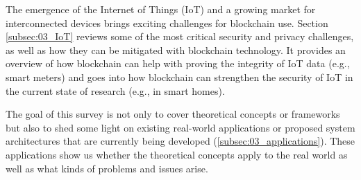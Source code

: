 The emergence of the Internet of Things (IoT) and a growing market for interconnected devices brings exciting challenges for blockchain use. Section \ref{subsec:03_IoT} reviews some of the most critical security and privacy challenges, as well as how they can be mitigated with blockchain technology. It provides an overview of how blockchain can help with proving the integrity of IoT data (e.g., smart meters) and goes into how blockchain can strengthen the security of IoT in the current state of research (e.g., in smart homes).

The goal of this survey is not only to cover theoretical concepts or frameworks but also to shed some light on existing real-world applications or proposed system architectures that are currently being developed (\ref{subsec:03_applications}). These applications show us whether the theoretical concepts apply to the real world as well as what kinds of problems and issues arise.
